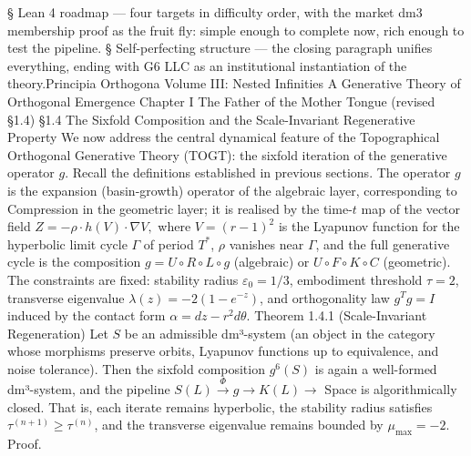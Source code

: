 § Lean 4 roadmap — four targets in difficulty order, with the market dm3 membership proof as the fruit fly: simple enough to complete now, rich enough to test the pipeline.
§ Self-perfecting structure — the closing paragraph unifies everything, ending with G6 LLC as an institutional instantiation of the theory.Principia Orthogona
Volume III: Nested Infinities
A Generative Theory of Orthogonal Emergence
Chapter I
The Father of the Mother Tongue
(revised §1.4)
§1.4 The Sixfold Composition and the Scale-Invariant Regenerative Property
We now address the central dynamical feature of the Topographical Orthogonal Generative Theory (TOGT): the sixfold iteration of the generative operator $  g  $. Recall the definitions established in previous sections. The operator $  g  $ is the expansion (basin-growth) operator of the algebraic layer, corresponding to Compression in the geometric layer; it is realised by the time-$  t  $ map of the vector field
$   Z = -\rho \cdot h(V) \cdot \nabla V,   $
where $  V = (r-1)^2  $ is the Lyapunov function for the hyperbolic limit cycle $  \Gamma  $ of period $  T^*  $, $  \rho  $ vanishes near $  \Gamma  $, and the full generative cycle is the composition $  g = U \circ R \circ L \circ g  $ (algebraic) or $  U \circ F \circ K \circ C  $ (geometric). The constraints are fixed: stability radius $  \varepsilon_0 = 1/3  $, embodiment threshold $  \tau = 2  $, transverse eigenvalue $  \lambda(z) = -2(1-e^{-z})  $, and orthogonality law $  g^T g = I  $ induced by the contact form $  \alpha = dz - r^2 d\theta  $.
Theorem 1.4.1 (Scale-Invariant Regeneration)
Let $  S  $ be an admissible dm³-system (an object in the category whose morphisms preserve orbits, Lyapunov functions up to equivalence, and noise tolerance). Then the sixfold composition $  g^6(S)  $ is again a well-formed dm³-system, and the pipeline $  S(L) \xrightarrow{\Phi} g \to K(L) \to  $ Space is algorithmically closed. That is, each iterate remains hyperbolic, the stability radius satisfies $  \tau^{(n+1)} \ge \tau^{(n)}  $, and the transverse eigenvalue remains bounded by $  \mu_{\max} = -2  $.
Proof.
